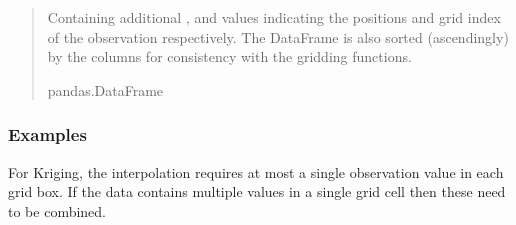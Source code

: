 \documentclass[letterpaper,10pt,english]{sphinxmanual}
\begin{document}
\begin{fulllineitems}
\begin{quote}
\begin{description}
\begin{itemize}
\end{itemize}

\sphinxAtStartPar
{} \textendash{} Containing additional , and  values
indicating the positions and grid index of the observation
respectively. The DataFrame is also sorted (ascendingly) by the
 columns for consistency with the gridding functions.

\sphinxAtStartPar
pandas.DataFrame

\end{description}\end{quote}
\subsubsection*{Examples}

\begin{sphinxVerbatim}[commandchars=\\\{\}]
  
  
    \PYG{p}{[} \PYG{p}{]}
\end{sphinxVerbatim}

\end{fulllineitems}


\sphinxAtStartPar
For Kriging, the interpolation requires at most a single observation value in each grid box. If the
data contains multiple values in a single grid cell then these need to be combined.
\end{document}
